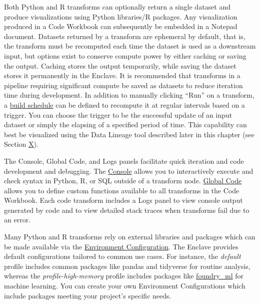 \documentclass[
  letterpaper,
  DIV=11,
  numbers=noendperiod]{scrreprt}
\begin{document}
Both Python and R transforms can optionally return a single dataset and
produce visualizations using Python libraries/R packages. Any
visualization produced in a Code Workbook can subsequently be embedded
in a Notepad document. Datasets returned by a transform are ephemeral by
default, that is, the transform must be recomputed each time the dataset
is used as a downstream input, but options exist to conserve compute
power by either caching or saving the output. Caching stores the output
temporarily, while saving the dataset stores it permanently in the
Enclave. It is recommended that transforms in a pipeline requiring
significant compute be saved as datasets to reduce iteration time during
development. In addition to manually clicking ``Run'' on a transform, a
\href{https://www.palantir.com/docs/foundry/building-pipelines/scheduling-overview/}{build
schedule} can be defined to recompute it at regular intervals based on a
trigger. You can choose the trigger to be the successful update of an
input dataset or simply the elapsing of a specified period of time. This
capability can best be visualized using the Data Lineage tool described
later in this chapter (see Section \protect\hyperlink{Data-Lineage}{X}).

The Console, Global Code, and Logs panels facilitate quick iteration and
code development and debugging. The
\href{https://www.palantir.com/docs/foundry/code-workbook/workbooks-console/}{Console}
allows you to interactively execute and check syntax in Python, R, or
SQL outside of a transform node.
\href{https://www.palantir.com/docs/foundry/code-workbook/workbooks-global-code/}{Global
Code} allows you to define custom functions available to all transforms
in the Code Workbook. Each code transform includes a Logs panel to view
console output generated by code and to view detailed stack traces when
transforms fail due to an error.

Many Python and R transforms rely on external libraries and packages
which can be made available via the
\href{https://www.palantir.com/docs/foundry/code-workbook/environment-overview/}{Environment
Configuration}. The Enclave provides default configurations tailored to
common use cases. For instance, the \emph{default} profile includes
common packages like pandas and tidyverse for routine analysis, whereas
the \emph{profile-high-memory} profile includes packages like
\href{https://www.palantir.com/docs/foundry/develop-models/python-models/}{foundry\_ml}
for machine learning. You can create your own Environment Configurations
which include packages meeting your project's specific needs.
\end{document}
